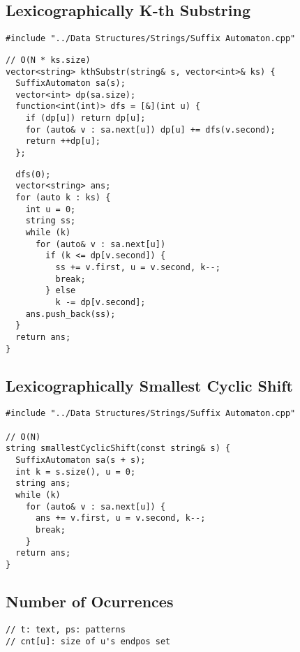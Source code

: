 \documentclass[twoside]{article}
\begin{document}
\begin{multicols*}{2}
\subsectionfont{\large\bfseries\sffamily\underline}
\subsection*{Lexicographically K-th Substring}
\begin{verbatim}
#include "../Data Structures/Strings/Suffix Automaton.cpp"
\end{verbatim}
\vspace{-12pt}
\begin{verbatim}
// O(N * ks.size)
vector<string> kthSubstr(string& s, vector<int>& ks) {
  SuffixAutomaton sa(s);
  vector<int> dp(sa.size);
  function<int(int)> dfs = [&](int u) {
    if (dp[u]) return dp[u];
    for (auto& v : sa.next[u]) dp[u] += dfs(v.second);
    return ++dp[u];
  };
\end{verbatim}
\vspace{-12pt}
\begin{verbatim}
  dfs(0);
  vector<string> ans;
  for (auto k : ks) {
    int u = 0;
    string ss;
    while (k)
      for (auto& v : sa.next[u])
        if (k <= dp[v.second]) {
          ss += v.first, u = v.second, k--;
          break;
        } else
          k -= dp[v.second];
    ans.push_back(ss);
  }
  return ans;
}
\end{verbatim}

\subsectionfont{\large\bfseries\sffamily\underline}
\subsection*{Lexicographically Smallest Cyclic Shift}
\begin{verbatim}
#include "../Data Structures/Strings/Suffix Automaton.cpp"

// O(N)
string smallestCyclicShift(const string& s) {
  SuffixAutomaton sa(s + s);
  int k = s.size(), u = 0;
  string ans;
  while (k)
    for (auto& v : sa.next[u]) {
      ans += v.first, u = v.second, k--;
      break;
    }
  return ans;
}
\end{verbatim}

\subsectionfont{\large\bfseries\sffamily\underline}
\subsection*{Number of Ocurrences}
\begin{verbatim}
// t: text, ps: patterns
// cnt[u]: size of u's endpos set


\end{verbatim}
\end{multicols*}
\end{document}
